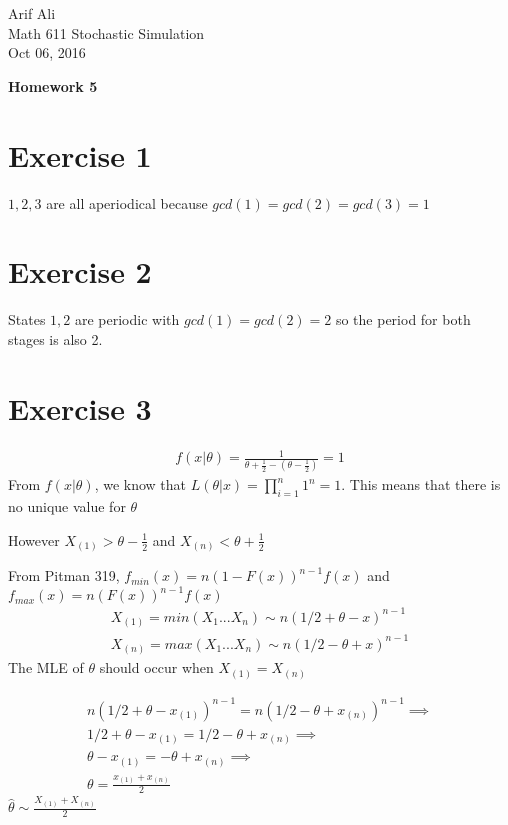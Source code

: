 \documentclass{article}\usepackage[]{graphicx}\usepackage[]{color}
\begin{document}
\begin{flushright}
Arif Ali\\
Math 611 Stochastic Simulation\\
Oct 06, 2016\\
\end{flushright}

\begin{center}
\LARGE\textbf{Homework 5}
  \end{center}
\section*{Exercise 1}
$1,2,3$ are all aperiodical because $gcd(1)=gcd(2)=gcd(3)=1$
\section*{Exercise 2}
States $1,2$ are periodic with $gcd(1)=gcd(2)=2$ so the period for both stages is also 2.
\section*{Exercise 3}

\begin{equation} 
\begin{split}
f(x|\theta) = \frac{1}{\theta+\frac{1}{2}-(\theta-\frac{1}{2})}= 1
\end{split}
\end{equation}
From $f(x|\theta)$, we know that $L(\theta|x) = \prod_{i=1}^{n} 1^{n} =1$. This means that there is no unique value for $\theta$ 

However $X_{(1)} > \theta -\frac{1}{2}$ and $X_{(n)} < \theta+ \frac{1}{2}$

From Pitman 319, $f_{min}(x)=n(1-F(x))^{n-1}f(x)$ and $f_{max}(x)=n(F(x))^{n-1}f(x)$
\begin{equation}
\begin{split}
X_{(1)} = min(X_1...X_n) \sim n(1/2+\theta-x)^{n-1} \\
X_{(n)} = max(X_1...X_n) \sim n(1/2-\theta+x)^{n-1}
\end{split}
\end{equation}
The MLE of $\theta$ should occur when $X_{(1)}=X_{(n)}$

\begin{equation}
\begin{split}
n(1/2+\theta-x_{(1)})^{n-1} = n(1/2-\theta+x_{(n)})^{n-1} \implies \\
1/2+\theta-x_{(1)} = 1/2-\theta+x_{(n)} \implies \\
\theta-x_{(1)} = -\theta+x_{(n)} \implies \\
\theta = \frac{x_{(1)} + x_{(n)}}{2}
\end{split}
\end{equation}
$\hat{\theta} \sim \frac{X_{(1)} + X_{(n)}}{2}$
\end{document}
